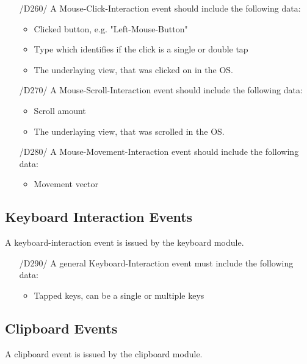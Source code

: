 \begin{itemize}
\item[/D260/] A Mouse-Click-Interaction event should include the following data:
	\begin{itemize}
	\item Clicked button, e.g. "Left-Mouse-Button"
	\item Type which identifies if the click is a single or double tap
	\item The underlaying view, that was clicked on in the OS. 
	\end{itemize}

\item[/D270/] A Mouse-Scroll-Interaction event should include the following data:
	\begin{itemize}
	\item Scroll amount
	\item The underlaying view, that was scrolled in the OS.
	\end{itemize}

\item[/D280/] A Mouse-Movement-Interaction event should include the following data:
	\begin{itemize}
	\item Movement vector
	\end{itemize}
\end{itemize}

\subsection{Keyboard Interaction Events}

A keyboard-interaction event is issued by the keyboard module.

\begin{itemize}
\item[/D290/] A general Keyboard-Interaction event must include the following data:
	\begin{itemize}
	\item Tapped keys, can be a single or multiple keys
	\end{itemize}
\end{itemize}

\subsection{Clipboard Events}

A clipboard event is issued by the clipboard module.

